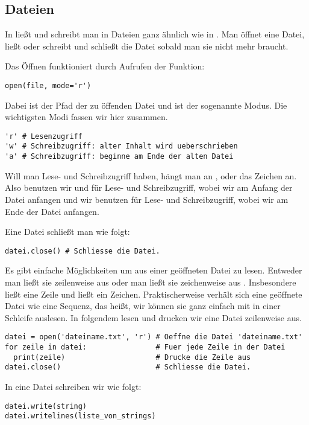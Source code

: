 \subsection{Dateien}
\label{section:std_data_types:file}
In \Python ließt und schreibt man in Dateien ganz ähnlich wie in \CC.
Man öffnet eine Datei, ließt oder schreibt und schließt die Datei sobald man sie nicht mehr braucht.

Das Öffnen funktioniert durch Aufrufen der Funktion:
\begin{lstlisting}
open(file, mode='r')
\end{lstlisting}
Dabei ist  der Pfad der zu öffenden Datei und  ist der sogenannte Modus.
Die wichtigsten Modi fassen wir hier zusammen.
\begin{lstlisting}
'r' # Lesenzugriff
'w' # Schreibzugriff: alter Inhalt wird ueberschrieben
'a' # Schreibzugriff: beginne am Ende der alten Datei
\end{lstlisting}
Will man Lese- und Schreibzugriff haben, hängt man an ,  oder  das Zeichen  an.
Also benutzen wir  und  für Lese- und Schreibzugriff, wobei wir am Anfang der Datei anfangen und
wir benutzen  für Lese- und Schreibzugriff, wobei wir am Ende der Datei anfangen.

Eine Datei  schließt man wie folgt:
\begin{lstlisting}
datei.close() # Schliesse die Datei.
\end{lstlisting}

Es gibt einfache Möglichkeiten um aus einer geöffneten Datei  zu lesen.
Entweder man ließt sie zeilenweise aus  oder man ließt sie zeichenweise aus .
Insbesondere ließt  eine Zeile und  ließt ein Zeichen.
Praktischerweise verhält sich eine geöffnete Datei wie eine Sequenz, das heißt, wir können sie ganz einfach mit in einer Schleife auslesen.
In folgendem lesen und drucken wir eine Datei zeilenweise aus.
\begin{lstlisting}
datei = open('dateiname.txt', 'r') # Oeffne die Datei 'dateiname.txt'
for zeile in datei:                # Fuer jede Zeile in der Datei
  print(zeile)                     # Drucke die Zeile aus
datei.close()                      # Schliesse die Datei.
\end{lstlisting}

In eine Datei schreiben wir wie folgt:
\begin{lstlisting}
datei.write(string)
datei.writelines(liste_von_strings)
\end{lstlisting}
